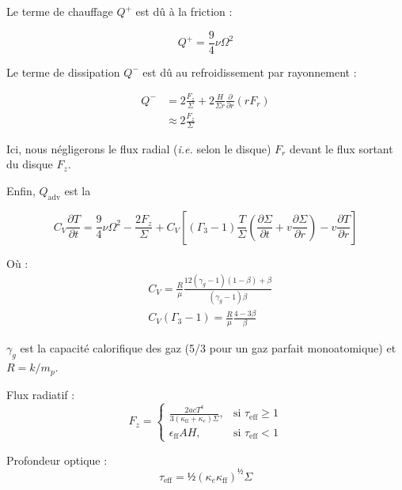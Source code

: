 Le terme de chauffage $Q^+$ est dû à la friction :

\begin{equation}
    \label{eq:chauffage}
    Q^+ = \frac{9}{4} \nu \Omega^2
\end{equation}

Le terme de dissipation $Q^-$ est dû au refroidissement par rayonnement :

\begin{align}
    Q^- &= 2 \frac{F_z}{\Sigma} + 2 \frac{H}{\Sigma r} \frac{\partial}{\partial r} \left(r F_r\right) \\
    \label{eq:refroidissement}
        &\approx 2 \frac{F_z}{\Sigma}
\end{align}

Ici, nous négligerons le flux radial (\textit{i.e.} selon le disque) $F_r$
devant le flux sortant du disque $F_z$.

Enfin, $Q_\mathrm{adv}$ est la 

\begin{equation}
    C_V \frac{\partial T}{\partial t} = \frac{9}{4} \nu \Omega^2 - \frac{2 F_z}{\Sigma} + C_V \left[ (\Gamma_3 - 1) \frac{T}{\Sigma} \left( \frac{\partial \Sigma}{\partial t} + v \frac{\partial \Sigma}{\partial r}  \right) - v \frac{\partial T}{\partial r} \right]
\end{equation}

Où :
\begin{align}
    &C_V = \frac{R}{\mu} \frac{12 (\gamma_g - 1)(1 - \beta) + \beta}{(\gamma_g - 1) \beta} \\
    &C_V (\Gamma_3 - 1) = \frac{R}{\mu} \frac{4 - 3\beta}{\beta}
\end{align}

$\gamma_g$ est la capacité calorifique des gaz (\num{5/3} pour un gaz parfait monoatomique) et $R = k / m_p$.

Flux radiatif :
\begin{equation}
    F_z =
    \begin{cases}
        \frac{2 a c T^4}{3 (\kappa_\mathrm{ff} + \kappa_e)\Sigma}, &\text{si $\tau_\mathrm{eff} \geq 1$} \\
        \epsilon_\mathrm{ff} A H, &\text{si $\tau_\mathrm{eff} < 1$}
    \end{cases}
\end{equation}

Profondeur optique :
\begin{equation}
    \tau_\mathrm{eff} = ½ (\kappa_e \kappa_\mathrm{ff})^½ \Sigma
\end{equation}

